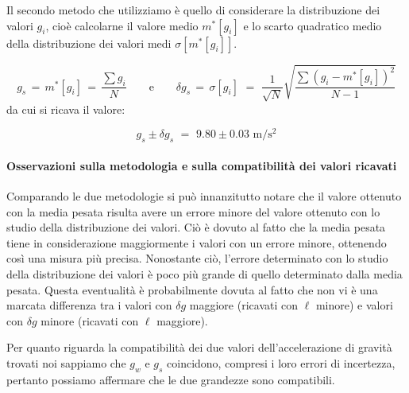 Il secondo metodo che utilizziamo è quello di considerare la distribuzione dei valori $g_i$, cioè calcolarne il valore medio $m^*[g_i]$ e lo scarto quadratico medio della distribuzione dei valori medi $\sigma[m^*[g_i]]$.

\begin{equation*}
g_s \, = \, m^*[g_i] \, = \, \frac{\sum g_i}{N} \quad\quad \text{e} \quad\quad \delta g_s \, = \, \sigma[g_i] \,\, = \,\, \frac{1}{\sqrt{N}}\sqrt{\frac{\sum (g_i - m^*[g_i])^2}{N-1}}
\end{equation*}
%
da cui si ricava il valore:

\begin{equation}
g_s \pm \delta g_s \,\, = \,\, 9.80 \pm 0.03 \,\, \si{\metre\per\square\second}
\end{equation}

\paragraph{Osservazioni sulla metodologia e sulla compatibilità dei valori ricavati\\}

Comparando le due metodologie si può innanzitutto notare che il valore ottenuto con la media pesata risulta avere un errore minore del valore ottenuto con lo studio della distribuzione dei valori. Ciò è dovuto al fatto che la media pesata tiene in considerazione maggiormente i valori con un errore minore, ottenendo così una misura più precisa. Nonostante ciò, l'errore determinato con lo studio della distribuzione dei valori è poco più grande di quello determinato dalla media pesata. Questa eventualità è probabilmente dovuta al fatto che non vi è una marcata differenza tra i valori con $\delta g$ maggiore (ricavati con $\ell$ minore) e valori con $\delta g$ minore (ricavati con $\ell$ maggiore).

Per quanto riguarda la compatibilità dei due valori dell'accelerazione di gravità trovati noi sappiamo che $g_w$ e $g_s$ coincidono, compresi i loro errori di incertezza, pertanto possiamo affermare che le due grandezze sono compatibili.

%	
